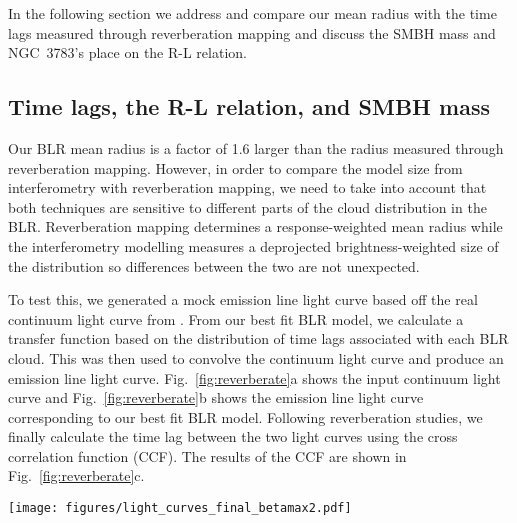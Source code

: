 \documentclass[longauth,]{aa}
\begin{document}
In the following section we address and compare our mean radius with the time lags measured through reverberation mapping and discuss the SMBH mass and NGC~3783's place on the R-L relation.

\subsection{Time lags, the R-L relation, and SMBH mass}
Our BLR mean radius is a factor of 1.6 larger than the radius measured through reverberation mapping. However, in order to compare the model size from interferometry with reverberation mapping, we need to take into account that both techniques are sensitive to different parts of the cloud distribution in the BLR. Reverberation mapping determines a response-weighted mean radius while the interferometry modelling measures a deprojected brightness-weighted size of the distribution so differences between the two are not unexpected.

To test this, we generated a mock emission line light curve based off the real continuum light curve from \citet{Bentz:2020aa}. 
From our best fit BLR model, we calculate a transfer function based on the distribution of time lags associated with each BLR cloud. This was then used to convolve the continuum light curve and produce an emission line light curve. Fig.~\ref{fig:reverberate}a shows the input continuum light curve and Fig.~\ref{fig:reverberate}b shows the emission line light curve corresponding to our best fit BLR model.
Following reverberation studies, we finally calculate the time lag between the two light curves using the cross correlation function (CCF). The results of the CCF are shown in Fig.~\ref{fig:reverberate}c.

\begin{figure*}
    \centering
    \texttt{[image: figures/light\_curves\_final\_betamax2.pdf]}
    \caption{\textit{a)} Observed continuum light curve from \citet{Bentz:2020aa} (black points) with the finer sampled interpolated continuum light curve over-plotted (gray line). \textit{b)} Observed broad emission line light curve (black points) with the emission line light curve produced by reverberating the input continuum light curve off the clouds in our best fit BLR model (red). \textit{c)} Cross-correlation function between the continuum and broad emission line light curves as a function of time lag. The dashed line indicates the peak cross correlation time lag of 10.2 days.
    }
    \label{fig:reverberate}
\end{figure*}
\end{document}

